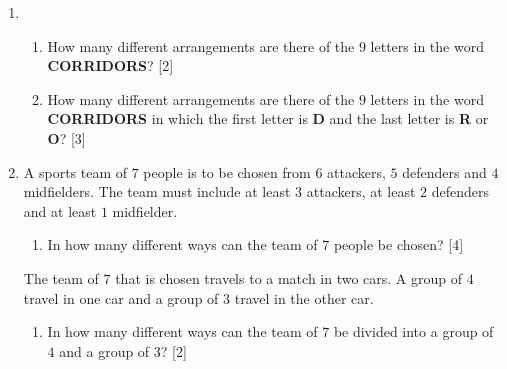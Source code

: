 \begin{enumerate}
\item  \begin{enumerate}[label=(\roman*)]
	\item How many different arrangements are there of the $9$ letters in the word \textbf{CORRIDORS}? \hfill[2]
	\item  How many different arrangements are there of the $9$ letters in the word \textbf{CORRIDORS} in which
	the first letter is \textbf{D} and the last letter is \textbf{R} or \textbf{O}? \hfill [3]
\end{enumerate}



\item  A sports team of $7$ people is to be chosen from $6$ attackers, $5$ defenders and $4$ midfielders. The team must include at least $3$ attackers, at least $2$ defenders and at least $1$ midfielder.

\begin{enumerate}[label=(\roman*)]
	\item In how many different ways can the team of $7$ people be chosen? \hfill[4]
\end{enumerate}

The team of $7$ that is chosen travels to a match in two cars. A group of $4$ travel in one car and a group of $3$ travel in the other car.

\begin{enumerate}[resume,label=(\roman*)]
	\item In how many different ways can the team of $7$ be divided into a group of $4$ and a group of $3$? \hfill[2]
\end{enumerate}
  













\end{enumerate}	
	
	
	
	
	
	
	
	
	
	
	
	













































